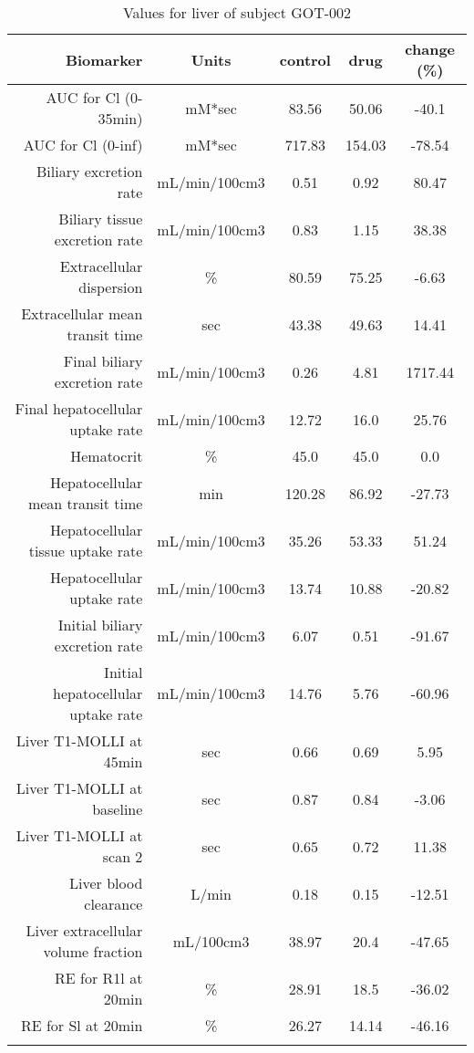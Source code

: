 \documentclass{epflreport}%
\begin{document}
%
\clearpage%
\begin{longtable}{rcccc}%
\hline%
Biomarker&Units&control&drug&change (\%)\\%
\hline%
AUC for Cl (0{-}35min)&mM*sec&83.56&50.06&{-}40.1\\%
AUC for Cl (0{-}inf)&mM*sec&717.83&154.03&{-}78.54\\%
Biliary excretion rate&mL/min/100cm3&0.51&0.92&80.47\\%
Biliary tissue excretion rate&mL/min/100cm3&0.83&1.15&38.38\\%
Extracellular dispersion&\%&80.59&75.25&{-}6.63\\%
Extracellular mean transit time&sec&43.38&49.63&14.41\\%
Final biliary excretion rate&mL/min/100cm3&0.26&4.81&1717.44\\%
Final hepatocellular uptake rate&mL/min/100cm3&12.72&16.0&25.76\\%
Hematocrit&\%&45.0&45.0&0.0\\%
Hepatocellular mean transit time&min&120.28&86.92&{-}27.73\\%
Hepatocellular tissue uptake rate&mL/min/100cm3&35.26&53.33&51.24\\%
Hepatocellular uptake rate&mL/min/100cm3&13.74&10.88&{-}20.82\\%
Initial biliary excretion rate&mL/min/100cm3&6.07&0.51&{-}91.67\\%
Initial hepatocellular uptake rate&mL/min/100cm3&14.76&5.76&{-}60.96\\%
Liver T1{-}MOLLI at 45min&sec&0.66&0.69&5.95\\%
Liver T1{-}MOLLI at baseline&sec&0.87&0.84&{-}3.06\\%
Liver T1{-}MOLLI at scan 2&sec&0.65&0.72&11.38\\%
Liver blood clearance&L/min&0.18&0.15&{-}12.51\\%
Liver extracellular volume fraction&mL/100cm3&38.97&20.4&{-}47.65\\%
RE for R1l at 20min&\%&28.91&18.5&{-}36.02\\%
RE for Sl at 20min&\%&26.27&14.14&{-}46.16\\%
\hline%
\caption{Values for liver of subject GOT-002} \\%
\end{longtable}%
\end{document}
